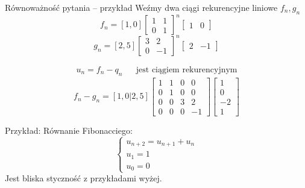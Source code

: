 \documentclass[handout]{beamer}
\theoremstyle{definition}
\theoremstyle{named}
\begin{document}
\begin{frame}{Równoważność pytania -- przykład}
Weźmy dwa ciągi rekurencyjne liniowe $f_n, g_n$
    \begin{equation*}
        f_{n} = [1,0] \begin{bmatrix}
            1 & 1 \\
            0 & 1 
        \end{bmatrix}^{n}
        \begin{bmatrix}
            1 & 0
        \end{bmatrix}
    \end{equation*}
    \begin{equation*}
         g_{n} = [2,5] \begin{bmatrix}
            3 & 2 \\
            0 & -1 
        \end{bmatrix}^{n}
        \begin{bmatrix}
            2 & -1
        \end{bmatrix}
    \end{equation*}
    
    \begin{align*}
        u_n = f_n - q_n && \text{jest ciągiem rekurencyjnym} 
    \end{align*}
    $$
        f_n - g_n = [1,0|2,5] 
        \left[
        \begin{array}{cc|cc}
        1 & 1 & 0 & 0 \\
        0 & 1 & 0 & 0 \\
        \hline
        0 & 0 & 3 & 2 \\
        0 & 0 & 0 & -1
        \end{array}
        \right]
        \begin{bmatrix}
            1  \\
            0  \\
            \hline
            -2 \\
            1 
        \end{bmatrix}
    $$
    
\end{frame}

\begin{frame}
    Przykład:
    Równanie Fibonacciego:
   \begin{equation*}
        \begin{cases}
        u_{n+2} = u_{n+1} + u_n \\
        u_{1} = 1 \\
        u_{0} = 0
        \end{cases}
    \end{equation*}
    Jest bliska styczność z przykładami wyżej. 

\end{frame}
\end{document}
